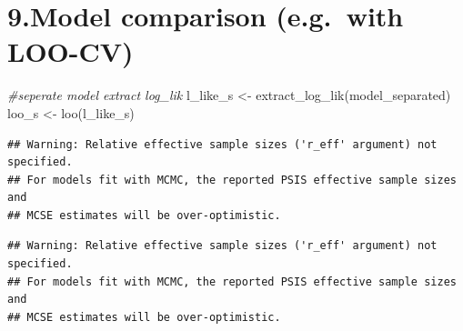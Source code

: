 \documentclass[
]{article}
\newenvironment{Shaded}{\begin{snugshade}}{\end{snugshade}}
\newcommand{\CommentTok}[1]{\textcolor[rgb]{0.56,0.35,0.01}{\textit{#1}}}
\newcommand{\DecValTok}[1]{\textcolor[rgb]{0.00,0.00,0.81}{#1}}
\newcommand{\FunctionTok}[1]{\textcolor[rgb]{0.00,0.00,0.00}{#1}}
\newcommand{\NormalTok}[1]{#1}
\newcommand{\OtherTok}[1]{\textcolor[rgb]{0.56,0.35,0.01}{#1}}
\newcommand{\SpecialCharTok}[1]{\textcolor[rgb]{0.00,0.00,0.00}{#1}}
\begin{document}
\hypertarget{model-comparison-e.g.-with-loo-cv}{%
\section{9.Model comparison (e.g.~with
LOO-CV)}\label{model-comparison-e.g.-with-loo-cv}}

\begin{Shaded}
\begin{Highlighting}[]
\CommentTok{\#seperate model extract log\_lik}
\NormalTok{l\_like\_s }\OtherTok{\textless{}{-}} \FunctionTok{extract\_log\_lik}\NormalTok{(model\_separated)}
\NormalTok{loo\_s }\OtherTok{\textless{}{-}} \FunctionTok{loo}\NormalTok{(l\_like\_s)}
\end{Highlighting}
\end{Shaded}

\begin{verbatim}
## Warning: Relative effective sample sizes ('r_eff' argument) not specified.
## For models fit with MCMC, the reported PSIS effective sample sizes and 
## MCSE estimates will be over-optimistic.
\end{verbatim}

\begin{Shaded}
\end{Shaded}

\begin{verbatim}
## Warning: Relative effective sample sizes ('r_eff' argument) not specified.
## For models fit with MCMC, the reported PSIS effective sample sizes and 
## MCSE estimates will be over-optimistic.
\end{verbatim}

\begin{Shaded}
\end{Shaded}
\end{document}
